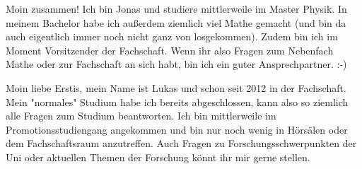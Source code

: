 \begin{multicols}{2}
\vspace{-0.4cm}

{
Moin zusammen! Ich bin Jonas und studiere mittlerweile im Master Physik. In meinem Bachelor habe ich außerdem ziemlich viel Mathe gemacht (und bin da auch eigentlich immer noch nicht ganz von losgekommen). 
Zudem bin ich im Moment Vorsitzender der Fachschaft. Wenn ihr also Fragen zum Nebenfach Mathe oder zur Fachschaft an sich habt, bin ich ein guter Ansprechpartner. :-)
}

{
Moin liebe Erstis, mein Name ist Lukas und schon seit 2012 in der Fachschaft. Mein "normales" Studium habe ich bereits abgeschlossen, kann also so ziemlich alle Fragen zum Studium beantworten.
Ich bin mittlerweile im Promotionsstudiengang angekommen und bin nur noch wenig in Hörsälen oder dem Fachschaftsraum anzutreffen.
Auch Fragen zu Forschungsschwerpunkten der Uni oder aktuellen Themen der Forschung könnt ihr mir gerne stellen.
}


\end{multicols}

